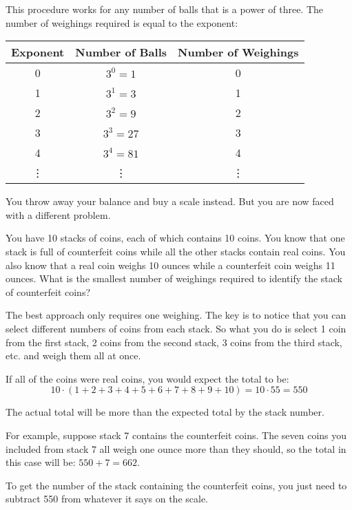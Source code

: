 \documentclass[fleqn,addpoints]{exam}
\begin{document}
\begin{questions}
\begin{solution}
  This procedure works for any number of balls that is a power of three.  The number of weighings required is equal to
  the exponent:

\begin{center}
  \begin{tabular}{|c|c|c|}
    \hline
    Exponent & Number of Balls & Number of Weighings \\
    \hline
    0 & $3^0 = 1$ & 0 \\
    1 & $3^1 = 3$ & 1 \\
    2 & $3^2 = 9$ & 2 \\
    3 & $3^3 = 27$ & 3 \\
    4 & $3^4 = 81$ & 4 \\
    \vdots & \vdots & \vdots \\
    \hline

  \end{tabular}
\end{center}

\end{solution}

\question

You throw away your balance and buy a scale instead.  But you are now faced with a different problem.  

You have 10 stacks of coins, each of which contains 10 coins.  You know that one stack is full of counterfeit coins
while all the other stacks contain real coins.  You also know that a real coin weighs 10 ounces while a counterfeit coin
weighs 11 ounces.  What is the smallest number of weighings required to identify the stack of counterfeit coins?

\begin{solution}

The best approach only requires one weighing.  The key is to notice that you can select
different numbers of coins from each stack.  So what you do is select 1 coin from the first stack, 2 coins from the
second stack, 3 coins from the third stack, etc. and weigh them all at once.

If all of the coins were real coins, you would expect the total to be: 
\[ 10 \cdot (1 + 2 + 3 + 4 + 5 + 6 + 7 + 8 + 9 + 10)  = 10 \cdot 55 = 550 \]

The actual total will be more than the expected total by the stack number.  

For example, suppose stack 7 contains the counterfeit coins.  The seven coins you included from stack 7 all weigh one
ounce more than they should, so the total in this case will be: \( 550 + 7 = 662 \).

To get the number of the stack containing the counterfeit coins, you just need to subtract 550 from whatever it says
on the scale.

\end{solution}


\end{questions}
\end{document}
